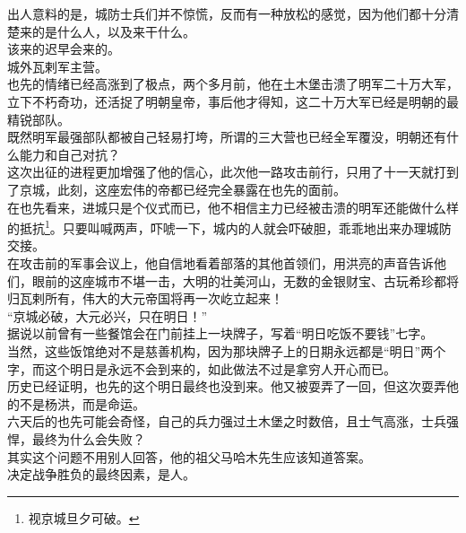 \begin{multicols}{\theparacolNo}
出人意料的是，城防士兵们并不惊慌，反而有一种放松的感觉，因为他们都十分清楚来的是什么人，以及来干什么。\\

该来的迟早会来的。\\

城外瓦剌军主营。\\

也先的情绪已经高涨到了极点，两个多月前，他在土木堡击溃了明军二十万大军，立下不朽奇功，还活捉了明朝皇帝，事后他才得知，这二十万大军已经是明朝的最精锐部队。\\

既然明军最强部队都被自己轻易打垮，所谓的三大营也已经全军覆没，明朝还有什么能力和自己对抗？\\

这次出征的进程更加增强了他的信心，此次他一路攻击前行，只用了十一天就打到了京城，此刻，这座宏伟的帝都已经完全暴露在也先的面前。\\

在也先看来，进城只是个仪式而已，他不相信主力已经被击溃的明军还能做什么样的抵抗\footnote{视京城旦夕可破。}。只要叫喊两声，吓唬一下，城内的人就会吓破胆，乖乖地出来办理城防交接。\\

在攻击前的军事会议上，他自信地看着部落的其他首领们，用洪亮的声音告诉他们，眼前的这座城市不堪一击，大明的壮美河山，无数的金银财宝、古玩希珍都将归瓦剌所有，伟大的大元帝国将再一次屹立起来！\\

“京城必破，大元必兴，只在明日！”\\

据说以前曾有一些餐馆会在门前挂上一块牌子，写着“明日吃饭不要钱”七字。\\

当然，这些饭馆绝对不是慈善机构，因为那块牌子上的日期永远都是“明日”两个字，而这个明日是永远不会到来的，如此做法不过是拿穷人开心而已。\\

历史已经证明，也先的这个明日最终也没到来。他又被耍弄了一回，但这次耍弄他的不是杨洪，而是命运。\\

六天后的也先可能会奇怪，自己的兵力强过土木堡之时数倍，且士气高涨，士兵强悍，最终为什么会失败？\\

其实这个问题不用别人回答，他的祖父马哈木先生应该知道答案。\\

决定战争胜负的最终因素，是人。\\


\end{multicols}
